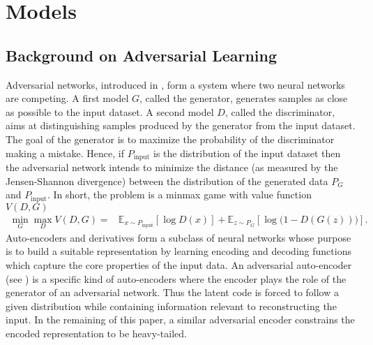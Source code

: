 \section{Models}\label{sec:Model_sup} \subsection{Background on Adversarial Learning}\label{sec:adversarial_learning}
Adversarial networks, introduced in \cite{goodfellow2014generative}, form a system where two neural networks are competing. A first model $G$, called the generator, generates  samples as close as possible to the input dataset. A second model $D$, called the discriminator, aims at distinguishing samples produced by the generator from the input dataset. The goal of the generator is to maximize the probability of  the discriminator making a mistake. Hence, if $P_\text{input}$ is the distribution of the input dataset then the adversarial network intends to minimize the distance (as measured by the Jensen-Shannon divergence) between the distribution of the generated data $P_G$ and $P_\text{input}$. In short, the problem is a minmax game with value function $V(D, G)$
\begin{align*}
    \min_{G}\max_{D} V(D, G) =  &\mathbb{E}_{x \sim P_{\text{input}} }[\log D(x)] + \mathbb{E}_{z \sim P_{G}}[\log\big(1 - D(G(z))\big)].
\end{align*}
Auto-encoders and derivatives \cite{Goodfellow-et-al-2016, laforgue2018autoencoding, fard2018deep} form a subclass of neural networks whose purpose is to build a suitable representation by learning encoding and decoding functions which capture the core properties of the input data.
An adversarial auto-encoder (see \cite{makhzani2015adversarial}) is a specific kind of auto-encoders where the encoder plays the role of the generator of an adversarial network. Thus the latent code is forced to follow a given distribution while containing information relevant to reconstructing the  input. In the remaining of this paper, a similar adversarial encoder constrains the encoded representation to be heavy-tailed. 

